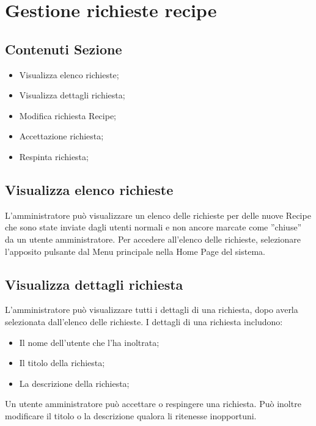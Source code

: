 %

\section{Gestione richieste recipe} %
\label{sec:gest_richieste}
	\subsection{Contenuti Sezione} %
	\label{sub:contenuti_sezione}
	\begin{itemize}
		\item Visualizza elenco richieste;
		\item Visualizza dettagli richiesta;
		\item Modifica richiesta Recipe;
		\item Accettazione richiesta;
		\item Respinta richiesta;
	\end{itemize}

	\subsection{Visualizza elenco richieste}
	L'amministratore può visualizzare un elenco delle richieste per delle nuove Recipe che sono state inviate dagli utenti normali e non ancore marcate come ''chiuse'' da un utente amministratore.
	Per accedere all'elenco delle richieste, selezionare l'apposito pulsante dal Menu principale nella Home Page del sistema.
	
	\subsection{Visualizza dettagli richiesta}
	L'amministratore può visualizzare tutti i dettagli di una richiesta, dopo averla selezionata dall'elenco delle richieste.
	I dettagli di una richiesta includono:
	\begin{itemize}
		\item Il nome dell'utente che l'ha inoltrata;
		\item Il titolo della richiesta;
		\item La descrizione della richiesta;
	\end{itemize}
	Un utente amministratore può accettare o respingere una richiesta.
	Può inoltre modificare il titolo o la descrizione qualora li ritenesse inopportuni.
	
